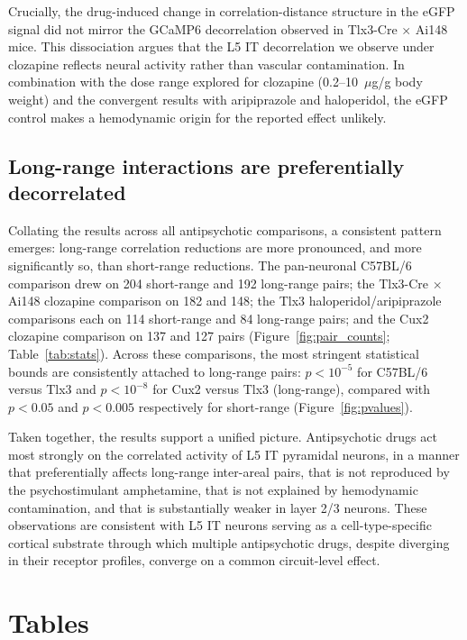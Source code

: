 \documentclass[11pt]{article}
\begin{document}
Crucially, the drug-induced change in correlation-distance structure in the eGFP signal did not mirror the GCaMP6 decorrelation observed in Tlx3-Cre $\times$ Ai148 mice. This dissociation argues that the L5 IT decorrelation we observe under clozapine reflects neural activity rather than vascular contamination. In combination with the dose range explored for clozapine (0.2--10~$\mu$g/g body weight) and the convergent results with aripiprazole and haloperidol, the eGFP control makes a hemodynamic origin for the reported effect unlikely.

\subsection{Long-range interactions are preferentially decorrelated}

Collating the results across all antipsychotic comparisons, a consistent pattern emerges: long-range correlation reductions are more pronounced, and more significantly so, than short-range reductions. The pan-neuronal C57BL/6 comparison drew on 204 short-range and 192 long-range pairs; the Tlx3-Cre $\times$ Ai148 clozapine comparison on 182 and 148; the Tlx3 haloperidol/aripiprazole comparisons each on 114 short-range and 84 long-range pairs; and the Cux2 clozapine comparison on 137 and 127 pairs (Figure~\ref{fig:pair_counts}; Table~\ref{tab:stats}). Across these comparisons, the most stringent statistical bounds are consistently attached to long-range pairs: $p<10^{-5}$ for C57BL/6 versus Tlx3 and $p<10^{-8}$ for Cux2 versus Tlx3 (long-range), compared with $p<0.05$ and $p<0.005$ respectively for short-range (Figure~\ref{fig:pvalues}).

Taken together, the results support a unified picture. Antipsychotic drugs act most strongly on the correlated activity of L5 IT pyramidal neurons, in a manner that preferentially affects long-range inter-areal pairs, that is not reproduced by the psychostimulant amphetamine, that is not explained by hemodynamic contamination, and that is substantially weaker in layer 2/3 neurons. These observations are consistent with L5 IT neurons serving as a cell-type-specific cortical substrate through which multiple antipsychotic drugs, despite diverging in their receptor profiles, converge on a common circuit-level effect.

\section{Tables}
\end{document}
